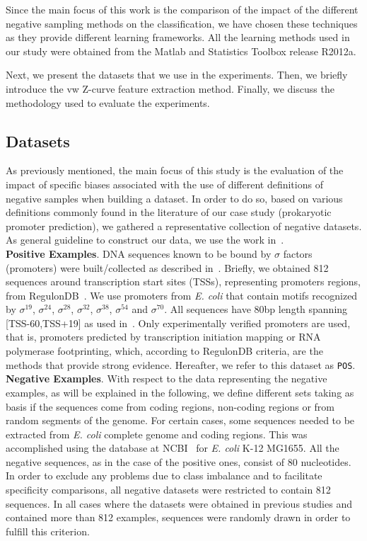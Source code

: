 \documentclass[conference,letterpaper]{IEEEtran}
\begin{document}
Since the main focus of this work is the comparison of the impact of the different negative sampling methods on the classification, we have chosen these techniques as they provide different learning frameworks. All the learning methods used in our study were obtained from the Matlab and Statistics Toolbox release R2012a.

Next, we present the datasets that we use in the experiments. Then, we briefly introduce the vw Z-curve feature extraction method. Finally, we discuss the methodology used to evaluate the experiments.

\subsection{Datasets}

As previously mentioned, the main focus of this study is the evaluation of the impact of specific biases associated with the use of different definitions of negative samples when building a dataset. In order to do so, based on various definitions commonly found in the literature of our case study  (prokaryotic promoter prediction), we gathered a representative collection of negative datasets. As general guideline to construct our data, we use the work in~\cite{gordon2003,song2011a}. \\

\noindent
{\bf Positive Examples}.  DNA sequences known to be bound by $\sigma$ factors (promoters) were built/collected  as described in~\cite{gordon2003,song2011a}. Briefly, we obtained 812 sequences around transcription start sites (TSSs), representing promoters regions, from RegulonDB~\cite{gama2011}. We use promoters from {\it E. coli} that contain motifs recognized by ${\sigma }^{{19}}$, ${\sigma }^{{24}}$, ${\sigma }^{{28}}$, ${\sigma }^{{32}}$, ${\sigma }^{{38}}$, ${\sigma }^{{54}}$ and ${\sigma }^{{70}}$. All sequences have 80bp length spanning [TSS-60,TSS+19] as used in~\cite{song2011a}. Only experimentally verified promoters are used, that is, promoters predicted by transcription initiation mapping or RNA polymerase footprinting, which, according to RegulonDB criteria, are the methods that provide strong evidence. Hereafter, we refer to this dataset as {\tt POS}.\\

\noindent
{\bf Negative Examples}. With respect to the data representing the negative examples, as will be explained in the following, we define different sets taking as basis if the sequences come from coding regions, non-coding regions or from random segments of the genome. For certain cases, some sequences needed to be extracted from {\it E. coli } complete genome and coding regions. This was accomplished using the database at NCBI~\cite{ncbi2012} for {\it E. coli } K-12 MG1655. All the negative sequences, as in the case of the positive ones, consist of 80 nucleotides. In order to exclude any problems due to class imbalance and to facilitate specificity comparisons, all negative datasets were restricted to contain 812 sequences. In all cases where the datasets were obtained in previous studies and contained more than 812 examples, sequences were randomly drawn in order to fulfill this criterion.
\end{document}
